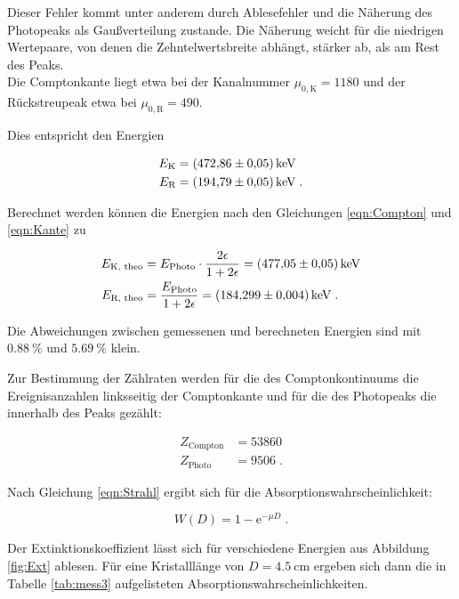 Dieser Fehler kommt unter anderem durch Ablesefehler und die Näherung des Photopeaks als Gaußverteilung zustande.
Die Näherung weicht für die niedrigen Wertepaare, von denen die Zehntelwertsbreite abhängt, stärker ab, als am Rest des Peaks. \\

Die Comptonkante liegt etwa bei der Kanalnummer $\mu_{0,\text{K}} = \num{1180}$ und der Rückstreupeak etwa bei
$\mu_{0, \text{R}} = \num{490}$.

Dies entspricht den Energien

\begin{align*}
  E_\text{K} &= \SI{472.86 +- 0.05}{\kilo\eV} \\
  E_\text{R} &= \SI{194.79 +- 0.05}{\kilo\eV} \; .
\end{align*}

Berechnet werden können die Energien nach den Gleichungen \eqref{eqn:Compton} und \eqref{eqn:Kante} zu

\begin{align*}
  E_\text{K, theo} &= E_\text{Photo} \cdot \frac{2 \epsilon}{1 + 2 \epsilon} = \SI{477.05 +- 0.05}{\kilo\eV} \\
  E_\text{R, theo} &= \frac{E_\text{Photo}}{1 + 2 \epsilon} =\SI{184.299 +- 0.004}{\kilo\eV} \; .
\end{align*}

Die Abweichungen zwischen gemessenen und berechneten Energien sind mit $\SI{0.88}{\percent}$ und $\SI{5.69}{\percent}$ klein. 

Zur Bestimmung der Zählraten werden für die des Comptonkontinuums die Ereignisanzahlen linksseitig der Comptonkante
und für die des Photopeaks die innerhalb des Peaks gezählt: 

\begin{align*}
  Z_\text{Compton} &= \num{53860} \\
  Z_\text{Photo} &= \num{9506} \; .
\end{align*}

Nach Gleichung \eqref{eqn:Strahl} ergibt sich für die Absorptionswahrscheinlichkeit:

\begin{equation}
  W(D) = 1 - \text{e}^{- \mu D} \; .
\end{equation}

Der Extinktionskoeffizient lässt sich für verschiedene Energien aus Abbildung \ref{fig:Ext} ablesen.
Für eine Kristalllänge von $D = \SI{4.5}{\centi\meter}$ ergeben sich dann die in Tabelle \ref{tab:mess3}
aufgelisteten Absorptionswahrscheinlichkeiten.

